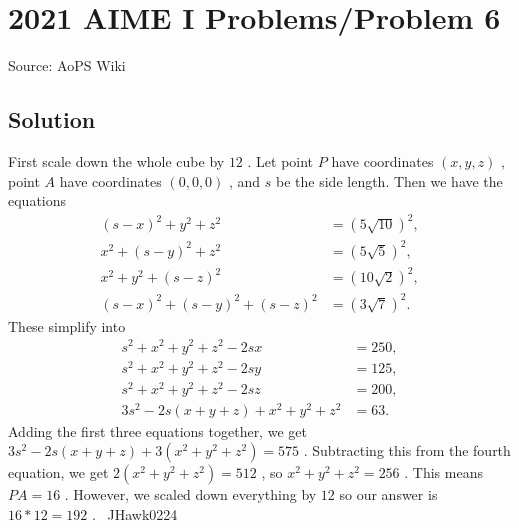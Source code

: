 \documentclass[12pt]{article}
\begin{document}
\section*{{2021 AIME I Problems/Problem 6}}
Source: AoPS Wiki

\subsection*{Solution}
First scale down the whole cube by $12$ . Let point $P$ have coordinates $(x, y, z)$ , point $A$ have coordinates $(0, 0, 0)$ , and $s$ be the side length. Then we have the equations \begin{align*} (s-x)^2+y^2+z^2&=\left(5\sqrt{10}\right)^2, \\ x^2+(s-y)^2+z^2&=\left(5\sqrt{5}\right)^2, \\ x^2+y^2+(s-z)^2&=\left(10\sqrt{2}\right)^2, \\ (s-x)^2+(s-y)^2+(s-z)^2&=\left(3\sqrt{7}\right)^2. \end{align*} These simplify into \begin{align*} s^2+x^2+y^2+z^2-2sx&=250, \\ s^2+x^2+y^2+z^2-2sy&=125, \\ s^2+x^2+y^2+z^2-2sz&=200, \\ 3s^2-2s(x+y+z)+x^2+y^2+z^2&=63. \end{align*} Adding the first three equations together, we get $3s^2-2s(x+y+z)+3(x^2+y^2+z^2)=575$ .
Subtracting this from the fourth equation, we get $2(x^2+y^2+z^2)=512$ , so $x^2+y^2+z^2=256$ . This means $PA=16$ . However, we scaled down everything by $12$ so our answer is $16*12=\boxed{192}$ . ~JHawk0224
\end{document}
